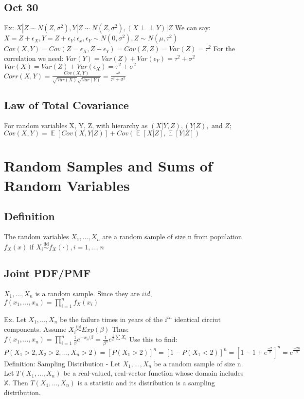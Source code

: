 \documentclass[twocolumn]{article}
\DeclareMathOperator{\EX}{\mathbb{E}} %
\newcommand{\indep}{\perp\!\!\!\!\perp} %
\let\Oldsum=\sum
\let\Oldprod=\prod
\renewcommand{\sum}{\Oldsum\limits}
\renewcommand{\prod}{\Oldprod\limits}
\newcommand{\iiddist}{\overset{\mathrm{iid}}{\sim}}
\begin{document}
\subsection*{Oct 30}
Ex: $X|Z \sim N(Z, \sigma^2), Y|Z \sim N(Z, \sigma^2), (X \indep Y)|Z$
We can say: $X = Z + \epsilon_X, Y = Z + \epsilon_Y: \epsilon_x, \epsilon_Y \sim N(0, \sigma^2), Z \sim N(\mu, \tau^2)$
$Cov(X,Y) = Cov(Z = \epsilon_X, Z + \epsilon_Y) = Cov(Z, Z) = Var(Z) = \tau^2$
For the correlation we need:
$Var(Y) = Var(Z) + Var(\epsilon_Y) = \tau^2 + \sigma^2$
$Var(X) = Var(Z) + Var(\epsilon_X) = \tau^2 + \sigma^2$
$Corr(X, Y) = \frac{Cov(X,Y)}{\sqrt{Var(X)}\sqrt{Var(Y)}} = \frac{\tau^2}{\tau^2 + \sigma^2}$

\subsection*{Law of Total Covariance}
For random variables X, Y, Z, with hierarchy as $(X|Y,Z), (Y|Z), \text{ and } Z$;
$Cov(X,Y) = \EX[Cov(X, Y|Z)] + Cov(\EX[X|Z], \EX[Y|Z])$


\section*{Random Samples and Sums of Random Variables}
\subsection*{Definition}
The random variables $X_1, ..., X_n$ are a random sample of size n from population $f_X(x)$ if $X_i \iiddist f_X(\cdot), i = 1, ..., n$

\subsection*{Joint PDF/PMF}
$X_1, ..., X_n$ is a random sample. Since they are $iid$, 
$f(x_1, ..., x_n) = \prod_{i=1}^{n} f_X(x_i)$

Ex. Let $X_1, ..., X_n$ be the failure times in years of the $i^{th}$ identical circiut components. 
Assume $X_i \iiddist Exp(\beta)$
Thus: $f(x_1, ..., x_n) = \prod_{i=1}^{n} \frac{1}{\beta} e^{-x_i / \beta} = \frac{1}{\beta^n} e^{\frac{1}{\beta}\sum X_i}$
Use this to find:
$P(X_1 > 2, X_2 > 2, ..., X_n > 2) = [P(X_1 > 2)]^n = [1 - P(X_1 < 2)]^n = [1 - 1 + e^{\frac{-2}{\beta}}]^n = e^{\frac{-2n}{\beta}}$\\

Definition: Sampling Distribution - Let $X_1, ..., X_n$ be a random sample of size n. Let $T(X_1, ..., X_n)$ be a real-valued, real-vector function whose domain includes $\mathbb{X}$.
Then $T(X_1, ..., X_n)$ is a statistic and its distribution is a sampling distribution. \\
\end{document}
